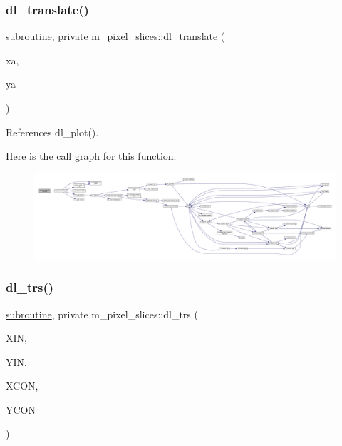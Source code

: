 \subsubsection{\texorpdfstring{dl\+\_\+translate()}{dl\_translate()}}
{\footnotesize\ttfamily \hyperlink{M__stopwatch_83_8txt_acfbcff50169d691ff02d4a123ed70482}{subroutine}, private m\+\_\+pixel\+\_\+slices\+::dl\+\_\+translate (\begin{DoxyParamCaption}\item[{}]{xa,  }\item[{}]{ya }\end{DoxyParamCaption})\hspace{0.3cm}{\ttfamily [private]}}



References dl\+\_\+plot().

Here is the call graph for this function\+:
\nopagebreak
\begin{figure}[H]
\begin{center}
\leavevmode
\includegraphics[width=350pt]{namespacem__pixel__slices_ad35fa14bd29e8e895f22de6500b6b5ff_cgraph}
\end{center}
\end{figure}
\mbox{\label{namespacem__pixel__slices_a141b4da9ce5a0d633cc488f656c0320d}} 
\subsubsection{\texorpdfstring{dl\+\_\+trs()}{dl\_trs()}}
{\footnotesize\ttfamily \hyperlink{M__stopwatch_83_8txt_acfbcff50169d691ff02d4a123ed70482}{subroutine}, private m\+\_\+pixel\+\_\+slices\+::dl\+\_\+trs (\begin{DoxyParamCaption}\item[{}]{X\+IN,  }\item[{}]{Y\+IN,  }\item[{}]{X\+C\+ON,  }\item[{}]{Y\+C\+ON }\end{DoxyParamCaption})\hspace{0.3cm}{\ttfamily [private]}}



